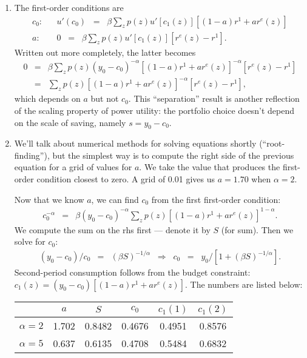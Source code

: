 \documentclass[11pt]{article}
\begin{document}
\begin{enumerate}
\begin{enumerate}
\item The first-order conditions are
\begin{eqnarray*}
    c_0:  &&  u'(c_0) \;\;=\;\; \beta \sum_z p(z)
            u'[c_1(z)] [ (1-a)r^1 + a r^e(z)] \\
    a:    && 0 \;\;=\;\; \beta \sum_z p(z) u'[c_1(z)] [r^e(z) - r^1 ]  .
\end{eqnarray*}
Written out more completely, the latter becomes
\begin{eqnarray*}
    0 &=& \beta \sum_z p(z) (y_0-c_0)^{-\alpha} [ (1-a)r^1 + a r^e(z)]^{-\alpha} [r^e(z) - r^1 ] \\
    &=&  \sum_z p(z) [ (1-a)r^1 + a r^e(z)]^{-\alpha} [r^e(z) - r^1 ] ,
\end{eqnarray*}
which depends on $a$ but not $c_0$.
This ``separation'' result is another reflection of the scaling property of 
power utility:  the portfolio choice doesn't depend on the scale of saving, namely 
$ s = y_0 - c_0 $.  

\item
We'll talk about numerical methods for solving equations shortly (``root-finding''),
but the simplest way is to compute the right side of the previous equation
for a grid of values for $a$.
We take the value that produces the first-order condition closest to zero.
A grid of 0.01 gives us $a=1.70$ when $\alpha=2$.

Now that we know $a$, we can find $c_0$ from the first first-order condition:
\begin{eqnarray*}
    c_0^{-\alpha}  &=&  \beta (y_0-c_0)^{-\alpha}
            \sum_z p(z) [ (1-a)r^1 + a r^e(z)]^{1-\alpha}  .
\end{eqnarray*}
We compute the sum on the rhs first --- denote it by $S$ (for sum).
Then we solve for $c_0$:
\begin{eqnarray*}
    (y_0-c_0)/c_0 &=& (\beta S)^{-1/\alpha}
        \;\;\Rightarrow\;\;
        c_0  \;\;=\;\; y_0 /[ 1 + (\beta S)^{-1/\alpha}] .
\end{eqnarray*}
Second-period consumption follows from the budget constraint:
$c_1(z)=  (y_0-c_0)[(1-a) r^1 + a r^e(z)] $.
The numbers are listed below:
\begin{center}
\begin{tabular}{lccccc}
\toprule
                &  $a$  &  $S$    & $c_0$   &  $c_1(1)$ &  $c_1(2)$  \\
\midrule
$\alpha = 2$    & 1.702 & 0.8482  & 0.4676  & 0.4951    & 0.8576 \\
$\alpha = 5$    & 0.637 & 0.6135  & 0.4708  & 0.5484    & 0.6832 \\
\bottomrule
\end{tabular}
\end{center}


\end{enumerate}
\end{enumerate}
\end{document}

